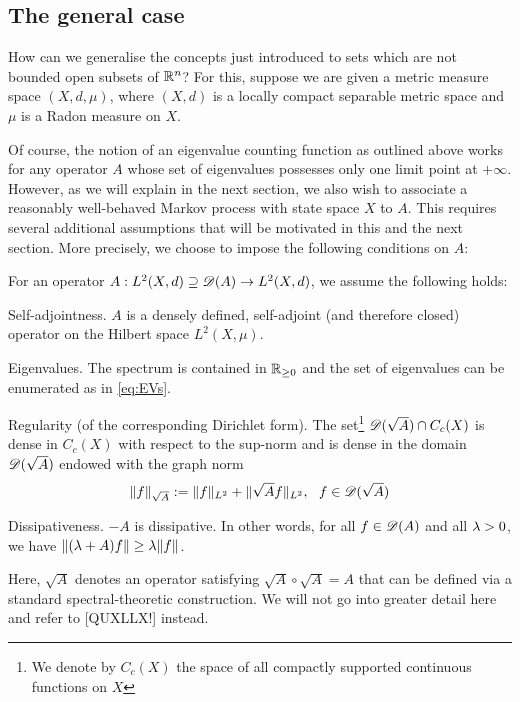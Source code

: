 \subsection{The general case}

How can we generalise the concepts just introduced to sets which are not bounded open subsets of $\mathbb{R}^n$? For this, suppose we are given a metric measure space 
$(X,d,\mu)$, where $(X,d)$ is a locally compact separable metric space and $\mu$ is a Radon measure on $X$.

Of course, the notion of an eigenvalue counting function as outlined above works for any operator $A$ whose set of eigenvalues possesses only one limit point at $+\infty$. However, as we will explain in the next section, we also wish to associate a reasonably well-behaved Markov process with state space $X$ to $A$. This requires several additional assumptions that will be motivated in this and the next section. More precisely, we choose to impose the following conditions on $A$:
\begin{cond}\label{cond:A}
For an operator $A:L^2(X,d)\supseteq\mathscr{D}(A)\to L^2(X,d)$, we assume the following holds:
\begin{compactdesc}
  \item[Self-adjointness.] $A$ is a densely defined, self-adjoint (and therefore closed) operator on the Hilbert space $L^2(X,\mu)$.
  \item[Eigenvalues.] The spectrum is contained in $\mathbb{R}_{\geq0}$ and the set of eigenvalues can be enumerated as in \eqref{eq:EVs}.
  \item[Regularity (of the corresponding Dirichlet form).] The set\footnote{We denote by $C_c(X)$ the space of all compactly supported continuous functions on $X$} $\mathscr{D}(\sqrt{A})\cap C_c(X)$ is dense in $C_c(X)$ with respect to the sup-norm and is dense in the domain $\mathscr{D}(\sqrt{A})$ endowed with the graph norm 
  \[
    \|f\|_{\sqrt{A}}:=\|f\|_{L^2}+\|\sqrt{A}f\|_{L^2},\ \ f\in\scD(\sqrt{A})
  \]
  \item[Dissipativeness.] $-A$ is dissipative. In other words, for all $f\in\mathscr{D}(A)$ and all $\lambda>0$, we have $\|(\lambda+A)f\|\geq\lambda\|f\|$.
\end{compactdesc}
\end{cond}
Here, $\sqrt{A}$ denotes an operator satisfying $\sqrt{A}\circ\sqrt{A}=A$ that can be defined via a standard spectral-theoretic construction. We will not go into greater detail here and refer to [QUXLLX!] instead.


